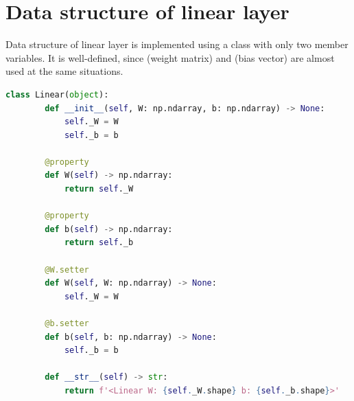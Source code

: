 \section{Data structure of linear layer}
\indent
    Data structure of linear layer is implemented using a class with only two member variables.
    It is well-defined, since  (weight matrix) and  (bias vector) are almost used at the same situations.
    \begin{lstlisting}[language=Python, caption={Date structure code of linear layer.}, label={linear-layer}]
    class Linear(object):      
        def __init__(self, W: np.ndarray, b: np.ndarray) -> None:
            self._W = W
            self._b = b
            
        @property
        def W(self) -> np.ndarray:
            return self._W
        
        @property
        def b(self) -> np.ndarray:
            return self._b
        
        @W.setter
        def W(self, W: np.ndarray) -> None:
            self._W = W
            
        @b.setter
        def b(self, b: np.ndarray) -> None:
            self._b = b
            
        def __str__(self) -> str:
            return f'<Linear W: {self._W.shape} b: {self._b.shape}>'\end{lstlisting}
